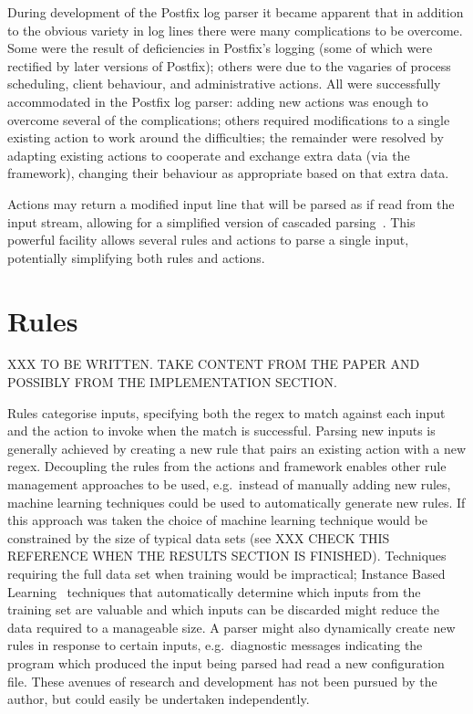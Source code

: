 During development of the Postfix log parser it became apparent that in
addition to the obvious variety in log lines there were many complications
to be overcome.  Some were the result of deficiencies in Postfix's logging
(some of which were rectified by later versions of Postfix); others were
due to the vagaries of process scheduling, client behaviour, and
administrative actions.  All were successfully accommodated in the Postfix
log parser: adding new actions was enough to overcome several of the
complications; others required modifications to a single existing action to
work around the difficulties; the remainder were resolved by adapting
existing actions to cooperate and exchange extra data (via the framework),
changing their behaviour as appropriate based on that extra data.

Actions may return a modified input line that will be parsed as if read
from the input stream, allowing for a simplified version of cascaded
parsing~\cite{cascaded-parsing}.  This powerful facility allows several
rules and actions to parse a single input, potentially simplifying both
rules and actions.


\section{Rules}

\label{rules in architecture}

XXX TO BE WRITTEN\@.  TAKE CONTENT FROM THE PAPER AND POSSIBLY FROM THE
IMPLEMENTATION SECTION\@.

Rules categorise inputs, specifying both the regex to match against each
input and the action to invoke when the match is successful.  Parsing new
inputs is generally achieved by creating a new rule that pairs an existing
action with a new regex.  Decoupling the rules from the actions and
framework enables other rule management approaches to be used, e.g.\
instead of manually adding new rules, machine learning techniques could be
used to automatically generate new rules.  If this approach was taken the
choice of machine learning technique would be constrained by the size of
typical data sets (see \sectionref{Results} XXX CHECK THIS REFERENCE WHEN
THE RESULTS SECTION IS FINISHED).  Techniques requiring the full data set
when training would be impractical; Instance Based
Learning~\cite{instance-based-learning} techniques that automatically
determine which inputs from the training set are valuable and which inputs
can be discarded might reduce the data required to a manageable size.  A
parser might also dynamically create new rules in response to certain
inputs, e.g.\ diagnostic messages indicating the program which produced the
input being parsed had read a new configuration file.  These avenues of
research and development has not been pursued by the author, but could
easily be undertaken independently.

